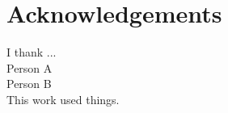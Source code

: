 \clearpage
{}
\chapter*{Acknowledgements}

I thank ... \\

Person A \\

Person B \\

This work used things.

\clearpage

